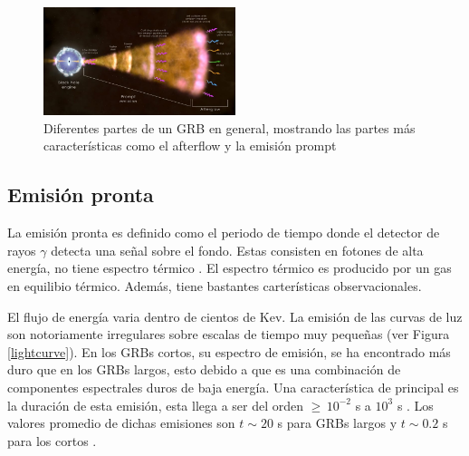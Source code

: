 \documentclass[12pt,a4paper]{book}
\begin{document}

\begin{figure} %
  \centering
    \includegraphics[width=0.5\textwidth]{Figuras/Gamma-ray_burst_by_a_blackhole-768x432.jpg}
  \caption{Diferentes partes de un GRB en general, mostrando las partes más características como el afterflow y la emisión prompt}
  \label{fig:Partes de GRBs}
\end{figure}
 

\subsection{Emisión pronta} %
La emisión pronta es definido como el periodo de tiempo donde el detector de rayos $\gamma$ detecta una señal sobre el fondo. Estas consisten en fotones de alta energía, no tiene espectro térmico \cite{GRB:CAP}. El espectro térmico es producido por un gas en equilibio térmico. Además, tiene bastantes carterísticas observacionales.

El flujo de energía varia dentro de cientos de Kev. La emisión de las curvas de luz son notoriamente irregulares sobre escalas de tiempo muy pequeñas \cite{SGRBr-Avanzo}(ver Figura \ref{lightcurve}). %
En los GRBs cortos, su espectro de emisión, se ha encontrado más duro que en los GRBs largos, esto debido a que es una combinación de componentes espectrales duros de baja energía. Una característica de principal es la duración de esta emisión, esta llega a ser del orden $\geq \, 10^{-2} $ s a $10^{3}$ s \cite{GRB:PPP}. Los valores promedio de dichas emisiones son $t \sim 20 $ s para GRBs largos y $t \sim 0.2 $ s para los cortos \cite{GRB:PPP}. %
\end{document}
